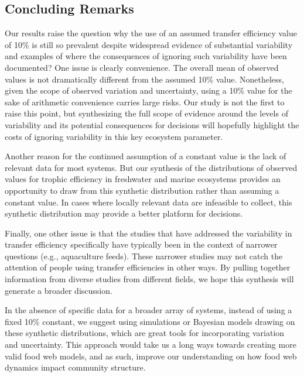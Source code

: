 \documentclass[oneside,12pt,final]{sty/ucthesis-CA2012}
\begin{document}
\begin{mainmatter}
\section{Concluding Remarks}
Our results raise the question why the use of an assumed transfer efficiency value of 10\% is still so prevalent despite widespread evidence of substantial variability and examples of where the consequences of ignoring such variability have been documented? One issue is clearly convenience. The overall mean of observed values is not dramatically different from the assumed 10\% value. Nonetheless, given the scope of observed variation and uncertainty, using a 10\% value for the sake of arithmetic convenience carries large risks. Our study is not the first to raise this point, but synthesizing the full scope of evidence around the levels of variability and its potential consequences for decisions will hopefully highlight the costs of ignoring variability in this key ecosystem parameter. 

\vspace{5mm}

Another reason for the continued assumption of a constant value is the lack of relevant data for most systems. But our synthesis of the distributions of observed values for trophic efficiency in freshwater and marine ecosystems provides an opportunity to draw from this synthetic distribution rather than assuming a constant value. In cases where locally relevant data are infeasible to collect, this synthetic distribution may provide a better platform for decisions. 

\vspace{5mm}

Finally, one other issue is that the studies that have addressed the variability in transfer efficiency specifically have typically been in the context of narrower questions (e.g., aquaculture feeds). These narrower studies may not catch the attention of people using transfer efficiencies in other ways. By pulling together information from diverse studies from different fields, we hope this synthesis will generate a broader discussion.

\vspace{5mm}

In the absence of specific data for a broader array of systems, instead of using a fixed 10\% constant, we suggest using simulations or Bayesian models drawing on these synthetic distributions, which are great tools for incorporating variation and uncertainty. This approach would take us a long ways towards creating more valid food web models, and as such, improve our understanding on how food web dynamics impact community structure. 



\end{mainmatter}
\end{document}
